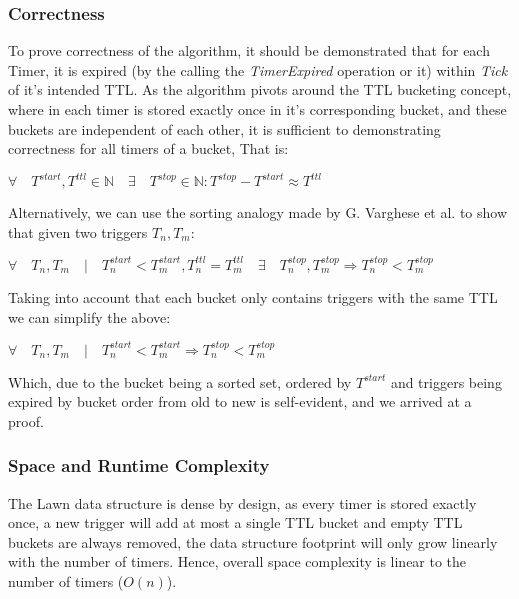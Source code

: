 \documentclass[twocolumn,a4paper]{article}
\begin{document}
\subsubsection{Correctness}
To prove correctness of the algorithm,  it should be demonstrated that for each Timer, it is expired (by the calling the \textit{TimerExpired} operation or it) within \textit{Tick} of it's intended TTL. As the algorithm pivots around the TTL bucketing concept, where in each timer is stored exactly once in it's corresponding bucket, and these buckets are independent of each other, it is sufficient to demonstrating correctness for all timers of a bucket, That is:
\begin{center}
	$\forall \quad T^{start}, T^{ttl} \in \mathbb{N} \quad \exists \quad T^{stop} \in \mathbb{N} : T^{stop}-T^{start} \approx T^{ttl}$
\end{center}

Alternatively, we can use the sorting analogy made by G. Varghese et al.\cite{TW} to show that given two triggers $T_n, T_m$: 

\begin{center}
	$\forall \quad T_n, T_m \quad | \quad T^{start}_n<T^{start}_m,  T^{ttl}_n = T^{ttl}_m \quad \exists\quad T^{stop}_n, T^{stop}_m  \Rightarrow T^{stop}_n < T^{stop}_m$
\end{center}

Taking into account that each bucket only contains triggers with the same TTL we can simplify the above:

\begin{center}
	$\forall \quad T_n, T_m \quad | \quad T^{start}_n<T^{start}_m \Rightarrow T^{stop}_n < T^{stop}_m$
\end{center}

Which, due to the bucket being a sorted set, ordered by $T^{start}$ and triggers being expired by bucket order from old to new is self-evident, and we arrived at a proof.

\subsubsection{Space and Runtime Complexity}
The Lawn data structure is dense by design, as every timer is stored exactly once, a new trigger will add at most a single TTL bucket and empty TTL buckets are always removed, the data structure footprint will only grow linearly with the number of timers. Hence, overall space complexity is linear to the number of timers ($O(n)$). 
\end{document}
